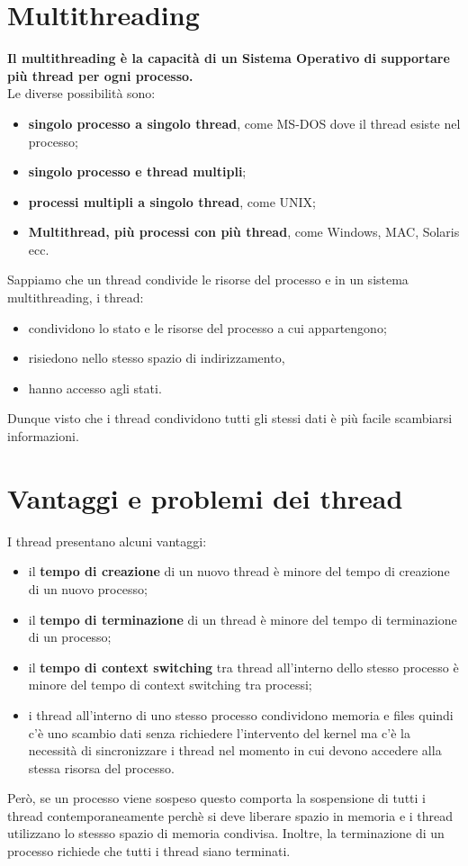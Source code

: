 \documentclass[12pt, letterpaper]{report}
\begin{document}
	\section{Multithreading}
	\textbf{Il multithreading è la capacità di un Sistema Operativo di supportare più thread per ogni processo.} \\
	Le diverse possibilità sono:
	\begin{itemize}
		\item \textbf{singolo processo a singolo thread}, come MS-DOS dove il thread esiste nel processo;
		\item \textbf{singolo processo e thread multipli};
		\item \textbf{processi multipli a singolo thread}, come UNIX;
		\item \textbf{Multithread, più processi con più thread}, come Windows, MAC, Solaris ecc.
	\end{itemize}
	Sappiamo che un thread condivide le risorse del processo e in un sistema multithreading, i thread:
	\begin{itemize}
		\item condividono lo stato e le risorse del processo a cui appartengono;
		\item risiedono nello stesso spazio di indirizzamento,
		\item hanno accesso agli stati.
	\end{itemize}
	Dunque visto che i thread condividono tutti gli stessi dati è più facile scambiarsi informazioni.
	\section{Vantaggi e problemi dei thread}
	I thread presentano alcuni vantaggi:
	\begin{itemize}
		\item il \textbf{tempo di creazione} di un nuovo thread è minore del tempo di creazione di un nuovo processo;
		\item il \textbf{tempo di terminazione} di un thread è minore del tempo di terminazione di un processo;
		\item il \textbf{tempo di context switching} tra thread all'interno dello stesso processo è minore del tempo di context switching tra processi;
		\item i thread all'interno di uno stesso processo condividono memoria e files quindi c'è uno scambio dati senza richiedere l'intervento del kernel ma c'è la necessità di sincronizzare i thread nel momento in cui devono accedere alla stessa risorsa del processo.
	\end{itemize}
	Però, se un processo viene sospeso questo comporta la sospensione di tutti i thread contemporaneamente perchè si deve liberare spazio in memoria e i thread utilizzano lo stessso spazio di memoria condivisa. Inoltre, la terminazione di un processo richiede che tutti i thread siano terminati.
\end{document}
